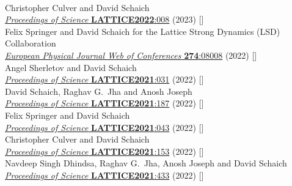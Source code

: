 \begin{spacelist}
\begin{revnumerate}
       \\
      Christopher Culver and David Schaich \\
      \href{https://doi.org/10.22323/1.430.0008}{\textit{Proceedings of Science} \textbf{LATTICE2022}:008} (2023) []
    \pagebreakitem
       \\
      Felix Springer and David Schaich for the Lattice Strong Dynamics (LSD) Collaboration \\
      \href{https://doi.org/10.1051/epjconf/202227408008}{\textit{European Physical Journal Web of Conferences} \textbf{274}:08008} (2022) []
    \pagebreakitem
       \\
      Angel Sherletov and David Schaich \\
      \href{https://doi.org/10.22323/1.396.0031}{\textit{Proceedings of Science} \textbf{LATTICE2021}:031} (2022) []
    \pagebreakitem
       \\
      David Schaich, Raghav G.~Jha and Anosh Joseph \\
      \href{https://doi.org/10.22323/1.396.0187}{\textit{Proceedings of Science} \textbf{LATTICE2021}:187} (2022) []
    \pagebreakitem
       \\
      Felix Springer and David Schaich \\
      \href{https://doi.org/10.22323/1.396.0043}{\textit{Proceedings of Science} \textbf{LATTICE2021}:043} (2022) []
    \pagebreakitem
       \\
      Christopher Culver and David Schaich \\
      \href{https://doi.org/10.22323/1.396.0153}{\textit{Proceedings of Science} \textbf{LATTICE2021}:153} (2022) []
    \pagebreakitem
       \\
      Navdeep Singh Dhindsa, Raghav G.~Jha, Anosh Joseph and David Schaich \\
      \href{https://doi.org/10.22323/1.396.0433}{\textit{Proceedings of Science} \textbf{LATTICE2021}:433} (2022) []
    \pagebreakitem
       \\

\end{revnumerate}
\end{spacelist}

